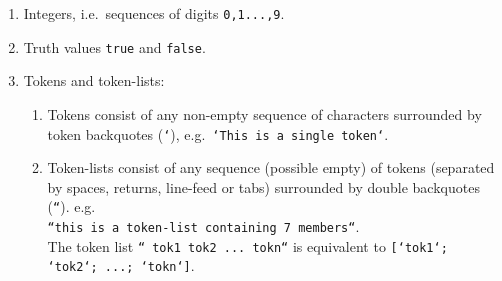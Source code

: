 \documentclass[11pt]{article}
\begin{document}
\begin{enumerate}\setlength{\itemsep}{0mm}\vspace*{-2mm}

  \item Integers, i.e.\ sequences of digits {\tt 0,1...,9}.

  \item Truth values {\tt true} and
	{\tt false}.

  \item Tokens and token-lists:

        \begin{enumerate}\setlength{\itemsep}{0mm}\vspace*{-3mm}
          \item Tokens consist of any non-empty sequence of characters
            surrounded by token backquotes ({\tt `}), e.g.\
       	  {\tt `This is a single token`}.
          \item Token-lists consist of any sequence (possible empty)
            of tokens (separated by spaces, returns, line-feed or
            tabs) surrounded by double backquotes ({\tt ``}). e.g.\\
       	  {\tt ``this is a token-list containing 7 members``}.\\
          The token list
       	  {\tt `` tok1 tok2 ... tokn``} is equivalent to
       	  {\tt [`tok1`; `tok2`; ...; `tokn`]}.
        \end{enumerate}\vspace*{-2mm}




\end{enumerate}
\end{document}
